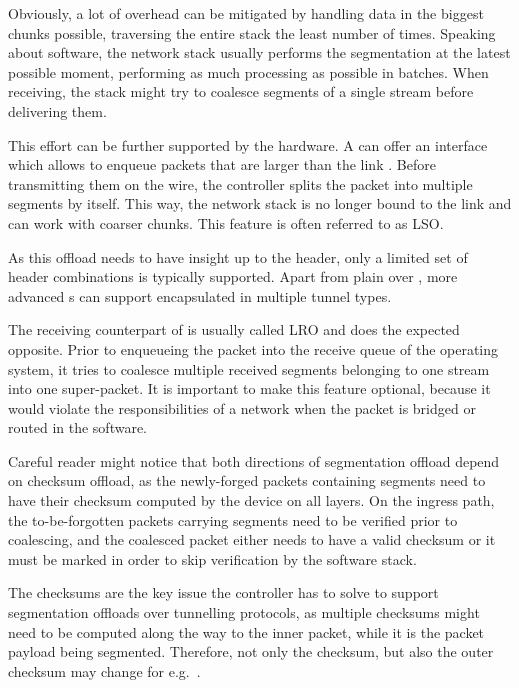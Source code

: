 Obviously, a lot of overhead can be mitigated by handling data in the biggest chunks
possible, traversing the entire stack the least number of times. Speaking about
software, the network stack usually performs the segmentation at the latest
possible moment, performing as much processing as possible in batches. When receiving, the stack
might try to coalesce segments of a single  stream before delivering them.

This effort can be further supported by the hardware. A  can offer an
interface which allows to enqueue  packets that are larger than the link
. Before transmitting them on the wire, the controller splits the packet
into multiple segments by itself. This way, the network stack is no longer
bound to the link  and can work with coarser chunks. This feature is
often referred to as \acrfull{LSO}.

As this offload needs to have insight up to the  header, only a limited
set of header combinations is typically supported. Apart from plain  over
, more advanced s can support  encapsulated in multiple
tunnel types.

The receiving counterpart of  is usually called \acrfull{LRO} and
does the expected opposite. Prior to enqueueing the packet into the receive
queue of the operating system, it tries to coalesce multiple received segments
belonging to one  stream into one super-packet. It is important to make
this feature optional, because it would violate the responsibilities of a network
when the packet is bridged or routed in the software.

Careful reader might notice that both directions of  segmentation offload depend on
checksum offload, as the newly-forged packets containing segments need to have their checksum
computed by the device on all layers. On the ingress path, the to-be-forgotten
packets carrying segments need to be verified prior to coalescing, and the
coalesced packet either needs to have a valid checksum or it must be marked in
order to skip verification by the software stack.

The checksums are the key issue the controller has to solve to support
segmentation offloads over tunnelling protocols, as multiple checksums might
need to be computed along the way to the inner  packet, while it is the
 packet payload being segmented. Therefore, not only the 
checksum, but also the outer  checksum may change for e.g.\ .


